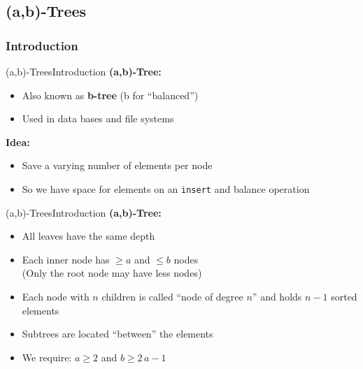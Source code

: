\subsection{(a,b)-Trees}
\subsubsection{Introduction}

\begin{frame}{(a,b)-Trees}{Introduction}
  \textbf{(a,b)-Tree:}
  \begin{itemize}
    \item<2->
      Also known as \textbf{b-tree} (b for \enquote{balanced})
    \item<3->
      Used in data bases and file systems
  \end{itemize}
  \textbf{Idea:}
  \begin{itemize}
    \item<5->
      Save a varying number of elements per node
    \item<6->
      So we have space for elements on an \texttt{\color{Mittel-Blau}insert}
      and balance operation
  \end{itemize}
\end{frame}


\begin{frame}{(a,b)-Trees}{Introduction}
  \textbf{(a,b)-Tree:}
  \begin{itemize}
    \item<2->
      All leaves have the same depth
    \item<3->
      Each inner node has {\color{Mittel-Blau}$\geq a$} and
      {\color{Mittel-Blau}$\leq b$} nodes\\
      (Only the root node may have less nodes)
  \end{itemize}
  \begin{figure}
    \begin{adjustbox}{width=0.3\linewidth}
      
    \end{adjustbox}
    \label{fig:a_b_tree:node_introduction}
  \end{figure}
    \begin{itemize}
    \item<5->
      Each node with {\color{Mittel-Blau}$n$} children is called \enquote{node of degree $n$} and
      holds {\color{Mittel-Blau}$n-1$} sorted elements
    \item<6->
      Subtrees are located \enquote{between} the elements
    \item<7->
      We require: {\color{Mittel-Blau}$a \geq 2$} and
      {\color{Mittel-Blau}$b \geq 2\,a - 1$}
  \end{itemize}
\end{frame}

